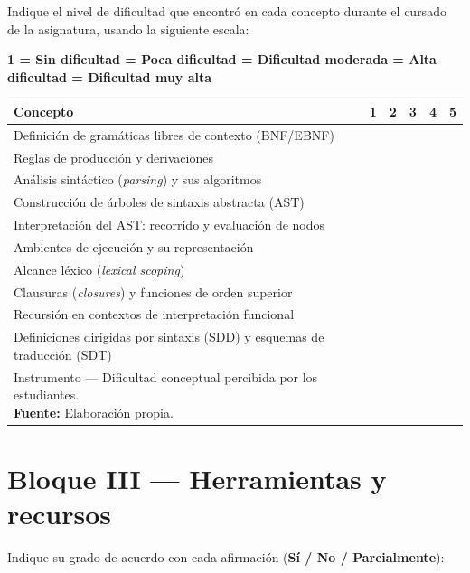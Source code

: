 Indique el nivel de dificultad que encontró en cada concepto durante el cursado de la asignatura, usando la siguiente escala:

\begin{center}
\textbf{1 = Sin dificultad  = Poca dificultad  = Dificultad moderada  = Alta dificultad  = Dificultad muy alta}
\end{center}

\begin{longtable}{|p{9cm}|p{0.5cm}|p{0.5cm}|p{0.5cm}|p{0.5cm}|p{0.5cm}|}
    \hline
    \textbf{Concepto} & \textbf{1} & \textbf{2} & \textbf{3} & \textbf{4} & \textbf{5} \\
    \hline
    Definición de gramáticas libres de contexto (BNF/EBNF) & & & & & \\ \hline
    Reglas de producción y derivaciones & & & & & \\ \hline
    Análisis sintáctico (\textit{parsing}) y sus algoritmos & & & & & \\ \hline
    Construcción de árboles de sintaxis abstracta (AST) & & & & & \\ \hline
    Interpretación del AST: recorrido y evaluación de nodos & & & & & \\ \hline
    Ambientes de ejecución y su representación & & & & & \\ \hline
    Alcance léxico (\textit{lexical scoping}) & & & & & \\ \hline
    Clausuras (\textit{closures}) y funciones de orden superior & & & & & \\ \hline
    Recursión en contextos de interpretación funcional & & & & & \\ \hline
    Definiciones dirigidas por sintaxis (SDD) y esquemas de traducción (SDT) & & & & & \\ \hline
    \caption{Instrumento — Dificultad conceptual percibida por los estudiantes.\\
    \scriptsize \textbf{Fuente:} Elaboración propia.}
    \label{tab:instrumento-dificultad}
\end{longtable}

\section*{Bloque III — Herramientas y recursos}

Indique su grado de acuerdo con cada afirmación (\textbf{Sí / No / Parcialmente}):

